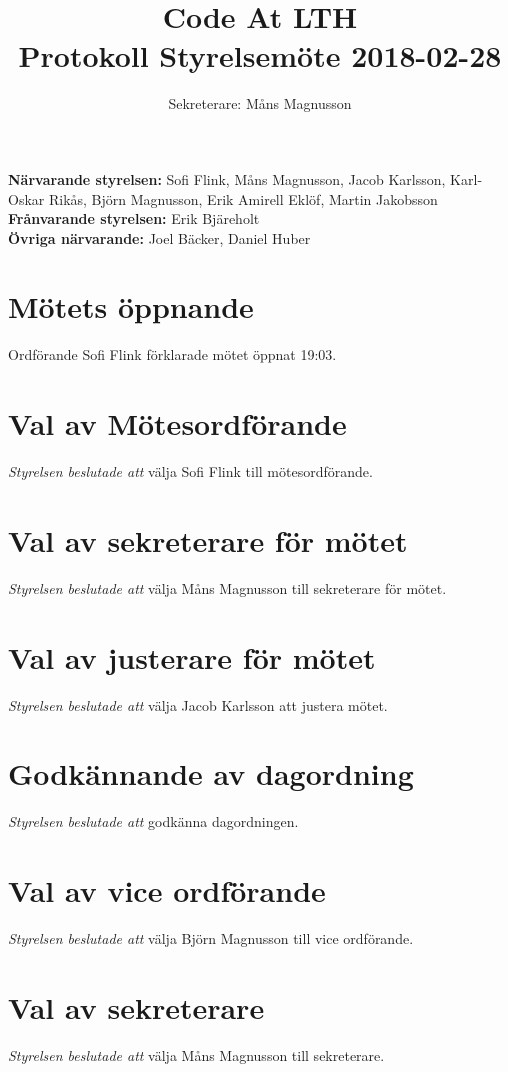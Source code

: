\documentclass{article}
\begin{document}
\title{
    \Huge{Code At LTH} \\
Protokoll Styrelsemöte 2018-02-28 }
\author{ Sekreterare: Måns Magnusson}
\date{}
\maketitle
\thispagestyle{first}

{\bf Närvarande styrelsen:} Sofi Flink, Måns Magnusson, Jacob Karlsson, Karl-Oskar Rikås, Björn Magnusson, Erik Amirell Eklöf, Martin Jakobsson \\
{\bf Frånvarande styrelsen:} Erik Bjäreholt\\
{\bf Övriga närvarande:} Joel Bäcker, Daniel Huber 

\section{Mötets öppnande}
Ordförande Sofi Flink förklarade mötet öppnat 19:03.

\section{Val av Mötesordförande}
\emph{Styrelsen beslutade att} välja Sofi Flink till mötesordförande.

\section{Val av sekreterare för mötet} 
\emph{Styrelsen beslutade att} välja Måns Magnusson till sekreterare för mötet. 

\section{Val av justerare för mötet} 
\emph{Styrelsen beslutade att} välja Jacob Karlsson att justera mötet. 

\section{Godkännande av dagordning}
\emph{Styrelsen beslutade att} godkänna dagordningen.

\section{Val av vice ordförande}
\emph{Styrelsen beslutade att} välja Björn Magnusson till vice ordförande.

\section{Val av sekreterare}
\emph{Styrelsen beslutade att} välja Måns Magnusson till sekreterare.
\end{document}
